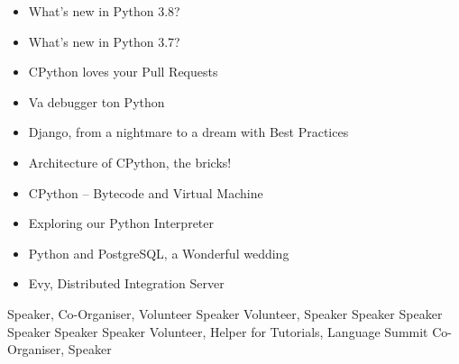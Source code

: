 \documentclass[
  a4paper,
]{fortysecondscv}
\begin{document}
\newpage
\makebacksidebar

\begin{itemize}
    \item{What's new in Python 3.8?}{}{ }
    \item{What's new in Python 3.7?}{}{ }
    \item{CPython loves your Pull Requests}{}{ }
    \item{Va debugger ton Python}{}{ }
    \item{Django, from a nightmare to a dream with Best Practices}{}{ }
    \item{Architecture of CPython, the bricks!}{}{ }
    \item{CPython -- Bytecode and Virtual Machine}{}{ }
    \item{Exploring our Python Interpreter}{}{ }
    \item{Python and PostgreSQL, a Wonderful wedding}{}{ }
    \item{Evy, Distributed Integration Server}{}{ }
\end{itemize}

\begin{cvtable}
     {Speaker, Co-Organiser, Volunteer}
     {Speaker}
     {Volunteer, Speaker}
     {Speaker}
     {Speaker}
     {Speaker}
     {Speaker}
     {Speaker}
     {Volunteer, Helper for Tutorials, Language Summit}
     {Co-Organiser, Speaker}
\end{cvtable}
\end{document}
